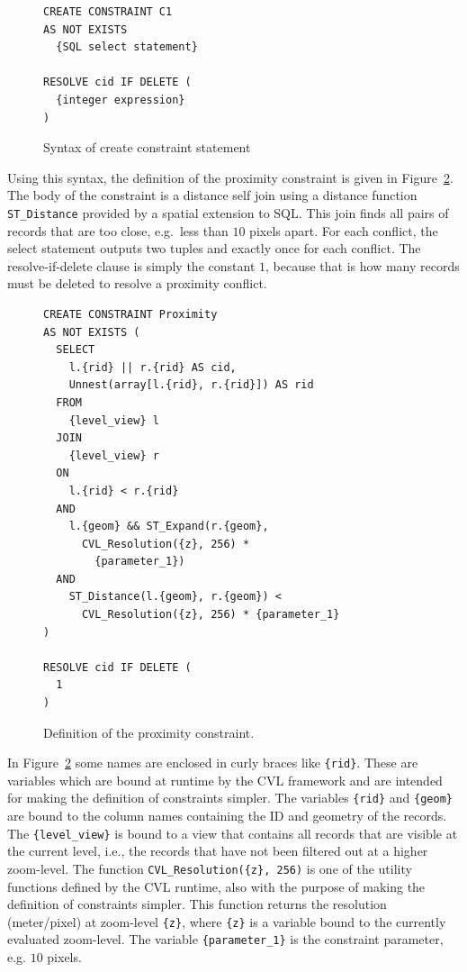 \begin{figure}[htbp]
\begin{center}
\begin{lstlisting}
CREATE CONSTRAINT C1
AS NOT EXISTS
  {SQL select statement}
  
RESOLVE cid IF DELETE (
  {integer expression}
)
\end{lstlisting}
\caption{Syntax of create constraint statement}
\label{fig:create:constraint:syntax}
\end{center}
\end{figure}

Using this syntax, the definition of the proximity constraint is given in Figure~\ref{fig:proximity:definition}. The body of the constraint is a distance self join using a distance function \texttt{ST\_Distance} provided by a spatial extension to SQL. This join finds all pairs of records that are too close, e.g.\ less than $10$ pixels apart. For each conflict, the select statement outputs two tuples and exactly once for each conflict. The resolve-if-delete clause is simply the constant $1$, because that is how many records must be deleted to resolve a proximity conflict.

\begin{figure}[htbp]
\begin{center}
\begin{lstlisting}
CREATE CONSTRAINT Proximity
AS NOT EXISTS (
  SELECT 
    l.{rid} || r.{rid} AS cid,
    Unnest(array[l.{rid}, r.{rid}]) AS rid
  FROM
    {level_view} l
  JOIN
    {level_view} r
  ON
    l.{rid} < r.{rid}
  AND
    l.{geom} && ST_Expand(r.{geom}, 
      CVL_Resolution({z}, 256) * 
        {parameter_1})
  AND
    ST_Distance(l.{geom}, r.{geom}) <
      CVL_Resolution({z}, 256) * {parameter_1}
)

RESOLVE cid IF DELETE (
  1
)
\end{lstlisting}
\caption{Definition of the proximity constraint.}
\label{fig:proximity:definition}
\end{center}
\end{figure}

In Figure~\ref{fig:proximity:definition} some names are enclosed in curly braces like \texttt{\{rid\}}. These are variables which are bound at runtime by the CVL framework and are intended for making the definition of constraints simpler. The variables \texttt{\{rid\}} and \texttt{\{geom\}} are bound to the column names containing the ID and geometry of the records. The \texttt{\{level\_view\}} is bound to a view that contains all records that are visible at the current level, i.e., the records that have not been filtered out at a higher zoom-level. The function \texttt{CVL\_Resolution(\{z\}, 256)} is one of the utility functions defined by the CVL runtime, also with the purpose of making the definition of constraints simpler. This function returns the resolution (meter/pixel) at zoom-level \texttt{\{z\}}, where \texttt{\{z\}} is a variable bound to the currently evaluated zoom-level. The variable \texttt{\{parameter\_1\}} is the constraint parameter, e.g. $10$ pixels.

